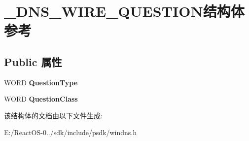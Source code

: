 \hypertarget{struct___d_n_s___w_i_r_e___q_u_e_s_t_i_o_n}{}\section{\+\_\+\+D\+N\+S\+\_\+\+W\+I\+R\+E\+\_\+\+Q\+U\+E\+S\+T\+I\+O\+N结构体 参考}
\label{struct___d_n_s___w_i_r_e___q_u_e_s_t_i_o_n}
\subsection*{Public 属性}
\begin{DoxyCompactItemize}
\item 
\mbox{\label{struct___d_n_s___w_i_r_e___q_u_e_s_t_i_o_n_a54f9edde0b4ee68a21dcd85a6cb0f7f5}} 
W\+O\+RD {\bfseries Question\+Type}
\item 
\mbox{\label{struct___d_n_s___w_i_r_e___q_u_e_s_t_i_o_n_a4a3ca497f3274d54e1dcd23034b18510}} 
W\+O\+RD {\bfseries Question\+Class}
\end{DoxyCompactItemize}


该结构体的文档由以下文件生成\+:\begin{DoxyCompactItemize}
\item 
E\+:/\+React\+O\+S-\/0../sdk/include/psdk/windns.\+h\end{DoxyCompactItemize}
